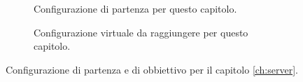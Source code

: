 \newsavebox{\myimage}
\begin{figure}[H]
    \centering%
    \begin{subfigure}{0.4\textwidth}
        \centering
        \usebox{\myimage}
        \caption{Configurazione di partenza per questo capitolo.}
        \label{fig:diag-simple_ips}
    \end{subfigure}
    \hfill%
    \begin{subfigure}{0.5\textwidth}
        \centering
        \caption{Configurazione virtuale da raggiungere per questo capitolo.}
        \label{fig:diag-simple_ips_vpn}
    \end{subfigure}%
    \caption{Configurazione di partenza e di obbiettivo per il capitolo \ref{ch:server}.}
\end{figure}

